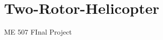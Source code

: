 \chapter{Two-\/\+Rotor-\/\+Helicopter}
\hypertarget{md__r_e_a_d_m_e}{}\label{md__r_e_a_d_m_e}
\label{md__r_e_a_d_m_e_autotoc_md42}%
%


ME 507 FInal Project 